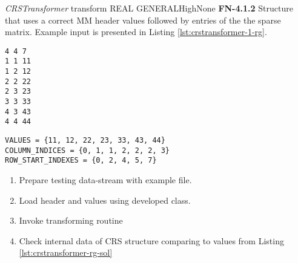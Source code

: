 \begin{testcase}{\emph{CRSTransformer} transform REAL GENERAL}{High}{None}
	{
		\textbf{FN-4.1.2}
	}
	{
		Structure that uses a correct \gls{MM} header values followed by entries of the the sparse matrix. Example input is presented in Listing \ref{lst:crstransformer-1-rg}. 	
	}
	\begin{lstlisting}[label={lst:crstransformer-1-rg},
	basicstyle=\small,caption={\gls{MM} format data example}, frame=single]
%%MatrixMarket matrix coordinate real general
4 4 7
1 1 11
1 2 12
2 2 22
2 3 23
3 3 33
4 3 43
4 4 44
	\end{lstlisting}
	\begin{lstlisting}[label={lst:crstransformer-rg-sol},
	basicstyle=\small,caption={\gls{CRS} format internal data example}, frame=single]
VALUES = {11, 12, 22, 23, 33, 43, 44}
COLUMN_INDICES = {0, 1, 1, 2, 2, 2, 3}
ROW_START_INDEXES = {0, 2, 4, 5, 7}
	\end{lstlisting}
	{
		\begin{enumerate}
			\item Prepare testing data-stream with example file.
			\item Load header and values using developed class.
			\item Invoke transforming routine 
			\item
			{
				Check internal data of \gls{CRS} structure comparing to values from Listing \ref{lst:crstransformer-rg-sol} 
			}
		\end{enumerate}
	}
\end{testcase}

